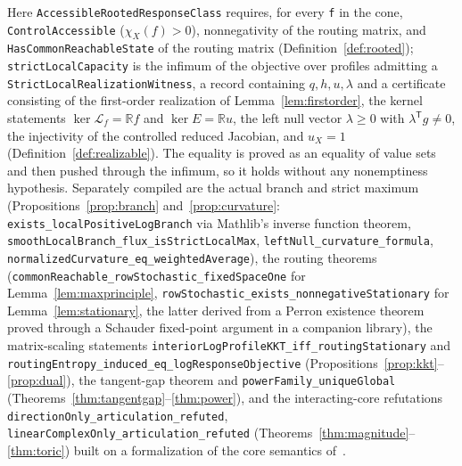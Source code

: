 \documentclass[11pt,reqno]{amsart}
\theoremstyle{plain}
\theoremstyle{definition}
\theoremstyle{remark}
\numberwithin{equation}{section}
\newcommand{\R}{\mathbb{R}}
\newcommand{\Ker}{\operatorname{ker}}
\newcommand{\T}{\mathsf{T}}
\begin{document}
Here \texttt{Accessible\allowbreak Rooted\allowbreak Response\allowbreak Class} requires, for every \texttt{f} in the cone, \texttt{ControlAccessible} ($\chi_X(f)>0$), nonnegativity of the routing matrix, and \texttt{HasCommon\allowbreak Reachable\allowbreak State} of the routing matrix (Definition~\ref{def:rooted}); \texttt{strictLocalCapacity} is the infimum of the objective over profiles admitting a \texttt{StrictLocal\allowbreak Realization\allowbreak Witness}, a record containing $q,h,u,\lambda$ and a certificate consisting of the first-order realization of Lemma~\ref{lem:firstorder}, the kernel statements $\Ker\mathcal L_f=\R f$ and $\Ker E=\R u$, the left null vector $\lambda\ge0$ with $\lambda^{\T}g\neq0$, the injectivity of the controlled reduced Jacobian, and $u_X=1$ (Definition~\ref{def:realizable}).  The equality is proved as an equality of value sets and then pushed through the infimum, so it holds without any nonemptiness hypothesis.  Separately compiled are the actual branch and strict maximum (Propositions~\ref{prop:branch} and~\ref{prop:curvature}: \texttt{exists\_\allowbreak localPositiveLogBranch} via Mathlib's inverse function theorem, \texttt{smoothLocalBranch\_\allowbreak flux\_\allowbreak isStrictLocalMax}, \texttt{leftNull\_\allowbreak curvature\_\allowbreak formula}, \texttt{normalizedCurvature\_\allowbreak eq\_\allowbreak weightedAverage}), the routing theorems (\texttt{commonReachable\_\allowbreak rowStochastic\_\allowbreak fixedSpaceOne} for Lemma~\ref{lem:maxprinciple}, \texttt{rowStochastic\_\allowbreak exists\_\allowbreak nonnegativeStationary} for Lemma~\ref{lem:stationary}, the latter derived from a Perron existence theorem proved through a Schauder fixed-point argument in a companion library), the matrix-scaling statements \texttt{interiorLogProfileKKT\_\allowbreak iff\_\allowbreak routingStationary} and \texttt{routingEntropy\_\allowbreak induced\_\allowbreak eq\_\allowbreak logResponseObjective} (Propositions~\ref{prop:kkt}--\ref{prop:dual}), the tangent-gap theorem and \texttt{powerFamily\_\allowbreak uniqueGlobal} (Theorems~\ref{thm:tangentgap}--\ref{thm:power}), and the interacting-core refutations \texttt{directionOnly\_\allowbreak articulation\_\allowbreak refuted}, \texttt{linearComplexOnly\_\allowbreak articulation\_\allowbreak refuted} (Theorems~\ref{thm:magnitude}--\ref{thm:toric}) built on a formalization of the core semantics of~\cite{KKRC25}.
\end{document}
